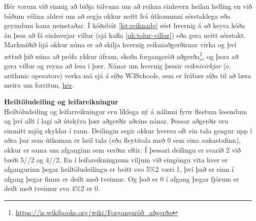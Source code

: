 Hér vorum við einnig að biðja tölvuna um að reikna einhvern heilan helling en við báðum vélina aldrei um að segja okkur neitt frá útkomunni sérstaklega eða geymdum hana neinstaðar.
Í kóðabút \ref{lst:reiknadg} sést hvernig á að keyra kóða án þess að fá einhverjar villur (sjá kafla \ref{uk:tolur-villur}) eða gera neitt sérstakt.
Markmiðið hjá okkur núna er að skilja hvernig reikniaðgerðirnar virka og því ættuð þið núna að prófa ykkur áfram, skoða forgangsröð aðgerða\footnote{\href{https://is.wikibooks.org/wiki/Forgangsr\%C3\%B6\%C3\%B0\_a\%C3\%B0ger\%C3\%B0a}{https://is.wikibooks.org/wiki/Forgangsröð\_aðgerða}}, og þora að gera villur og reyna að lesa í þær.
Nánar um hvernig þessir \emph{reiknivirkjar} (e. arithmic operators) verka má sjá á síðu W3Schools, sem er frábær síða til að læra meira um forritun, \href{https://www.w3schools.com/python/gloss_python_arithmetic_operators.asp}{hér}.

\begin{itarefni}
\textbf{Heiltöludeiling og leifareikningur}\\
	Heiltöludeiling og leifarreikningur eru líklega ný á nálinni fyrir flestum lesendum og því allt í lagi að útskýra þær aðgerðir aðeins nánar.
	Þessar aðgerðir eru einmitt mjög skyldar í raun.
	Deilingin segir okkur hversu oft ein tala gengur upp í aðra þar sem útkoman er heil tala (eða fleytitala með 0 sem eina aukastafinn), okkur er sama um afganginn sem verður eftir.
	Í þessari deilingu er svarið 2 við bæði 5//2 og 4//2.
	En í leifareikningnum viljum við eingöngu vita hver er afgangurinn þegar heiltöludeilingu er beitt svo 5\%2 væri 1, því það er einn í afgang þegar fimm er deilt með tveimur.
	Og það er 0 í afgang þegar fjórum er deilt með tveimur svo 4\%2 er 0.
\end{itarefni}

